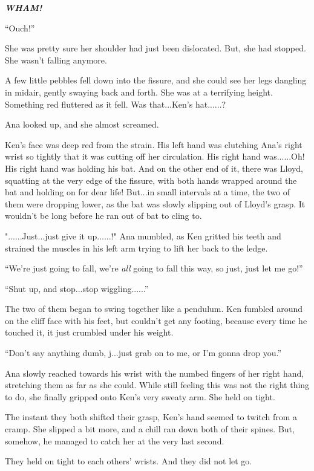 \documentclass[
]{article}
\begin{document}
\emph{\textbf{WHAM!}}

``Ouch!''

She was pretty sure her shoulder had just been dislocated. But, she had
stopped. She wasn't falling anymore.

A few little pebbles fell down into the fissure, and she could see her
legs dangling in midair, gently swaying back and forth. She was at a
terrifying height. Something red fluttered as it fell. Was that...Ken's
hat......?

Ana looked up, and she almost screamed.

Ken's face was deep red from the strain. His left hand was clutching
Ana's right wrist so tightly that it was cutting off her circulation.
His right hand was......Oh! His right hand was holding his bat. And on
the other end of it, there was Lloyd, squatting at the very edge of the
fissure, with both hands wrapped around the bat and holding on for dear
life! But...in small intervals at a time, the two of them were dropping
lower, as the bat was slowly slipping out of Lloyd's grasp. It wouldn't
be long before he ran out of bat to cling to.

"......Just...just give it up......!" Ana mumbled, as Ken gritted his
teeth and strained the muscles in his left arm trying to lift her back
to the ledge.

``We're just going to fall, we're \emph{all} going to fall this way, so
just, just let me go!''

``Shut up, and stop...stop wiggling......''

The two of them began to swing together like a pendulum. Ken fumbled
around on the cliff face with his feet, but couldn't get any footing,
because every time he touched it, it just crumbled under his weight.

``Don't say anything dumb, j...just grab on to me, or I'm gonna drop
you.''

Ana slowly reached towards his wrist with the numbed fingers of her
right hand, stretching them as far as she could. While still feeling
this was not the right thing to do, she finally gripped onto Ken's very
sweaty arm. She held on tight.

The instant they both shifted their grasp, Ken's hand seemed to twitch
from a cramp. She slipped a bit more, and a chill ran down both of their
spines. But, somehow, he managed to catch her at the very last second.

They held on tight to each others' wrists. And they did not let go.
\end{document}
